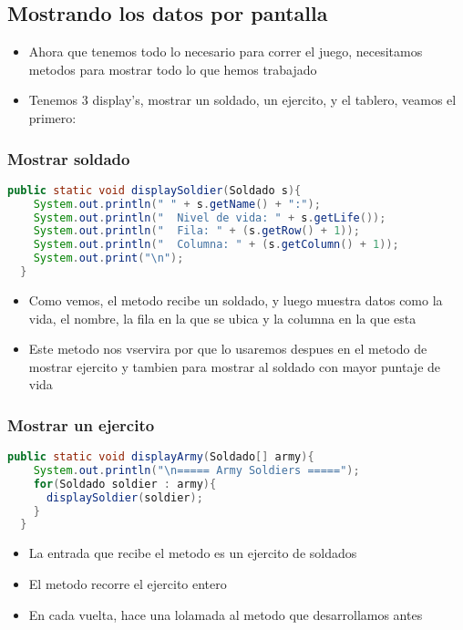 \subsection{Mostrando los datos por pantalla}
\begin{itemize}
    \item Ahora que tenemos todo lo necesario para correr el juego, necesitamos metodos para mostrar todo lo que hemos trabajado
    \item Tenemos 3 display's, mostrar un soldado, un ejercito, y el tablero, veamos el primero:
\end{itemize}
\subsubsection{Mostrar soldado}
      \begin{lstlisting}[language=java, caption={Clase Videojuego.java}]
  public static void displaySoldier(Soldado s){
    System.out.println(" " + s.getName() + ":");
    System.out.println("  Nivel de vida: " + s.getLife());
    System.out.println("  Fila: " + (s.getRow() + 1));
    System.out.println("  Columna: " + (s.getColumn() + 1));
    System.out.print("\n");
  }
\end{lstlisting}
\begin{itemize}
    \item Como vemos, el metodo recibe un soldado, y luego muestra datos como la vida, el nombre, la fila en la que se ubica y la columna en la que esta
    \item Este metodo nos vservira por que lo usaremos despues en el metodo de mostrar ejercito y tambien para mostrar al soldado con mayor puntaje de vida
\end{itemize}
\subsubsection{Mostrar un ejercito}
      \begin{lstlisting}[language=java, caption={Clase Videojuego.java}]
  public static void displayArmy(Soldado[] army){
    System.out.println("\n===== Army Soldiers =====");
    for(Soldado soldier : army){
      displaySoldier(soldier);
    }
  }
\end{lstlisting}
\begin{itemize}
    \item La entrada que recibe el metodo es un ejercito de soldados
    \item El metodo recorre el ejercito entero
    \item En cada vuelta, hace una lolamada al metodo que desarrollamos antes
\end{itemize}
